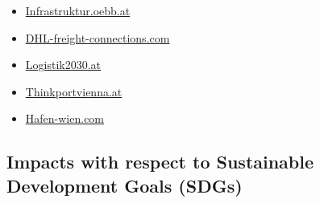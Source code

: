 \documentclass[
]{book}
\providecommand{\tightlist}{%
  \setlength{\itemsep}{0pt}\setlength{\parskip}{0pt}}
\begin{document}
\begin{itemize}
\tightlist
\item
  \href{https://infrastruktur.oebb.at/en/partners/terminals/locations/terminal-wien-sued}{Infrastruktur.oebb.at}
\item
  \href{https://dhl-freight-connections.com/de/unternehmen/dhl-eroffnet-hochmodernes-logistikdrehkreuz-am-flughafen-wien/}{DHL-freight-connections.com}
\item
  \href{https://www.logistik2030.at/?page_id=63}{Logistik2030.at}
\item
  \href{https://www.thinkportvienna.at/ueber-uns/projekte/}{Thinkportvienna.at}
\item
  \href{https://www.hafen-wien.com/de/home}{Hafen-wien.com}
\end{itemize}

\hypertarget{impacts-with-respect-to-sustainable-development-goals-sdgs-35}{%
\subsection*{Impacts with respect to Sustainable Development Goals (SDGs)}\label{impacts-with-respect-to-sustainable-development-goals-sdgs-35}}
\end{document}
